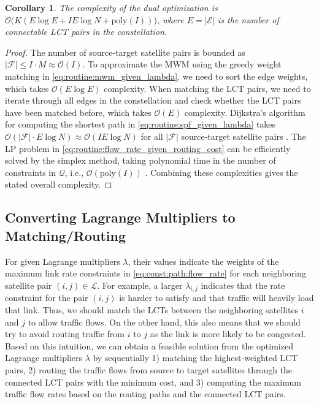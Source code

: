 \documentclass[journal]{IEEEtran}
\newtheorem{cor}{Corollary}
\begin{document}
\begin{cor}\label{cor:complexity:dual_optimization}
    The complexity of the dual optimization is $\mathcal{O}\big(K(E\log E + I E\log N  + \mathrm{poly}(I))\big)$, where $E=|\mathcal{E}|$ is the number of connectable LCT pairs in the constellation.
\end{cor}
\begin{proof}
The number of source-target satellite pairs is bounded as $|\mathcal{F}| \leq I \cdot M\approx\mathcal{O}(I)$.
To approximate the MWM using the greedy weight matching in \eqref{eq:routine:mwm_given_lambda}, we need to sort the edge weights, which takes $\mathcal{O}(E\log E)$ complexity. When matching the LCT pairs, we need to iterate through all edges in the constellation and check whether the LCT pairs have been matched before, which takes $\mathcal{O}(E)$ complexity. Dijkstra's algorithm for computing the shortest path in \eqref{eq:routine:spf_given_lambda} takes $\mathcal{O}(|\mathcal{F}|\cdot E\log N )\approx\mathcal{O}(I E\log N )$ for all $|\mathcal{F}|$ source-target satellite pairs \cite{cormen2022introduction}.
The LP problem in \eqref{eq:routine:flow_rate_given_routing_cost} can be efficiently solved by the simplex method, taking polynomial time in the number of constraints in $\mathcal{Q}$, i.e., $\mathcal{O}(\mathrm{poly}(I))$ \cite{vershynin2009hirsch}.
Combining these complexities gives the stated overall complexity.
\end{proof}


\subsection{Converting Lagrange Multipliers to Matching/Routing}\label{subsec:dual_variable_guided_matching_and_routing}
For given Lagrange multipliers $\lambda$, their values indicate the weights of the maximum link rate constraints in \eqref{eq:const:path:flow_rate} for each neighboring satellite pair $(i,j)\in\mathcal{L}$.
For example, a larger $\lambda_{i,j}$ indicates that the rate constraint for the pair $(i,j)$ is harder to satisfy and that traffic will heavily load that link.
Thus, we should match the LCTs between the neighboring satellites $i$ and $j$ to allow traffic flows.
On the other hand, this also means that we should try to avoid routing traffic from $i$ to $j$ as the link is more likely to be congested. 
Based on this intuition, we can obtain a feasible solution from the optimized Lagrange multipliers $\lambda$ by sequentially 1) matching the highest-weighted LCT pairs, 2) routing the traffic flows from source to target satellites through the connected LCT pairs with the minimum cost, and 3) computing the maximum traffic flow rates based on the routing paths and the connected LCT pairs.
\end{document}
